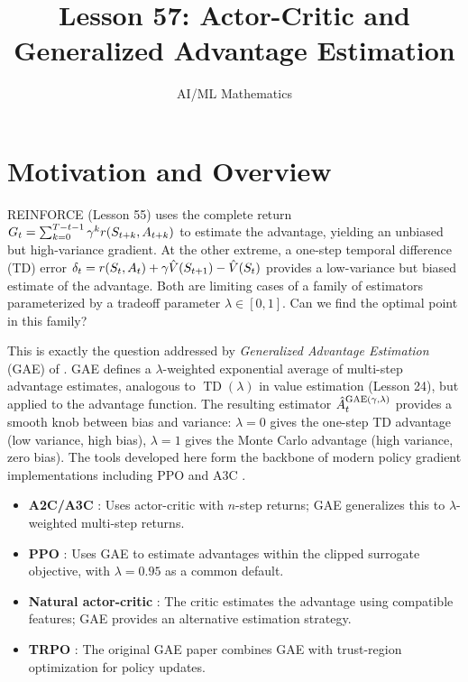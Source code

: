 \documentclass[11pt,a4paper]{article}
\title{Lesson 57: Actor-Critic and Generalized Advantage Estimation}
\author{AI/ML Mathematics}
\date{}
\begin{document}
\maketitle
\tableofcontents
\newpage

\section{Motivation and Overview}

REINFORCE (Lesson 55) uses the complete return $G_t = \sum_{k=0}^{T-t-1}
\gamma^k r(S_{t+k}, A_{t+k})$ to estimate the advantage, yielding an
unbiased but high-variance gradient. At the other extreme, a one-step
temporal difference (TD) error $\delta_t = r(S_t, A_t) + \gamma
\hat{V}(S_{t+1}) - \hat{V}(S_t)$ provides a low-variance but biased
estimate of the advantage. Both are limiting cases of a family of
estimators parameterized by a tradeoff parameter $\lambda \in [0,1]$.
Can we find the optimal point in this family?

This is exactly the question addressed by \emph{Generalized Advantage
Estimation} (GAE) of \citet{schulman2015}. GAE defines a
$\lambda$-weighted exponential average of multi-step advantage estimates,
analogous to $\operatorname{TD}(\lambda)$ in value estimation (Lesson 24),
but applied to the advantage function. The resulting estimator
$\hat{A}^{\mathrm{GAE}(\gamma,\lambda)}_t$ provides a smooth knob
between bias and variance: $\lambda = 0$ gives the one-step TD
advantage (low variance, high bias), $\lambda = 1$ gives the Monte
Carlo advantage (high variance, zero bias). The tools developed here
form the backbone of modern policy gradient implementations including
PPO \citep{schulman2017} and A3C \citep{mnih2016}.

\begin{rlconnection}
\begin{itemize}
  \item \textbf{A2C/A3C} \citep{mnih2016}: Uses actor-critic with
    $n$-step returns; GAE generalizes this to $\lambda$-weighted
    multi-step returns.
  \item \textbf{PPO} \citep{schulman2017}: Uses GAE to estimate
    advantages within the clipped surrogate objective, with $\lambda
    = 0.95$ as a common default.
  \item \textbf{Natural actor-critic} \citep{peters2008}: The critic
    estimates the advantage using compatible features; GAE provides an
    alternative estimation strategy.
  \item \textbf{TRPO} \citep{schulman2015trpo}: The original GAE paper
    combines GAE with trust-region optimization for policy updates.
\end{itemize}
\end{rlconnection}
\end{document}
